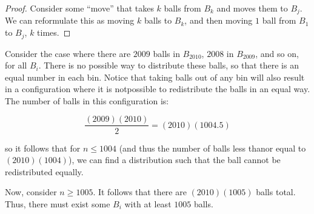 \documentclass[10pt, oneside]{article}
\begin{document}
    \begin{proof}
      Consider some ``move'' that takes $k$ balls from $B_k$ and moves them to $B_j$. We can reformulate this as moving $k$ balls to $B_k$, and
      then moving $1$ ball from $B_1$ to $B_j$, $k$ times.
    \end{proof}

    Consider the case where there are $2009$ balls in $B_{2010}$, $2008$ in $B_{2009}$, and so on, for all $B_i$. There is no possible way to distribute these
    balls, so that there is an equal number in each bin. Notice that taking balls out of any bin will also result in a configuration where it is notpossible to redistribute the
    balls in an equal way. The number of balls in this configuration is:

    $$\frac{(2009)(2010)}{2} = (2010)(1004.5)$$

    so it follows that for $n \leq 1004$ (and thus the number of balls less thanor equal to $(2010)(1004)$), we can find a distribution such that the ball cannot be redistributed
    equally.
    \newline

    Now, consider $n \geq 1005$. It follows that there are $(2010)(1005)$ balls total. Thus, there must exist some $B_i$ with at least $1005$ balls.


    
\end{document}
